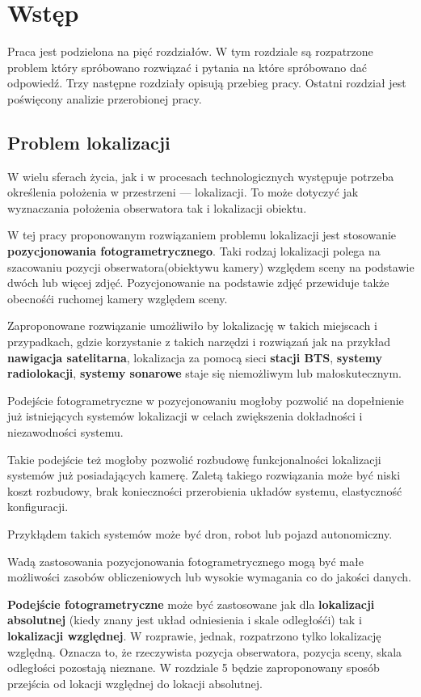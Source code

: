 
\chapter{Wstęp}
Praca jest podzielona na pięć rozdziałów. W tym rozdziale są rozpatrzone problem który spróbowano rozwiązać i pytania na które spróbowano dać odpowiedź. Trzy następne rozdziały opisują przebieg pracy. Ostatni rozdział jest poświęcony analizie przerobionej pracy.

\section{Problem lokalizacji}

W wielu sferach życia, jak i w procesach technologicznych występuje potrzeba określenia położenia w przestrzeni --- lokalizacji. To może dotyczyć jak wyznaczania położenia obserwatora tak i lokalizacji obiektu.

W tej pracy proponowanym rozwiązaniem problemu lokalizacji jest stosowanie \textbf{pozycjonowania fotogrametrycznego}. Taki rodzaj lokalizacji polega na szacowaniu pozycji obserwatora(obiektywu kamery) względem sceny na podstawie dwóch lub więcej zdjęć. Pozycjonowanie na podstawie zdjęć przewiduje także obecnośći ruchomej kamery względem sceny.

Zaproponowane rozwiązanie umożliwiło by lokalizację w takich miejscach i przypadkach, gdzie korzystanie z takich narzędzi i rozwiązań jak na przykład \textbf{nawigacja satelitarna}, lokalizacja za pomocą sieci \textbf{stacji BTS}, \textbf{systemy radiolokacji}, \textbf{systemy sonarowe} staje się niemożliwym lub małoskutecznym.

Podejście fotogrametryczne w pozycjonowaniu mogłoby pozwolić na dopełnienie już istniejących systemów lokalizacji w celach zwiększenia dokładności i niezawodności systemu.

Takie podejście też mogłoby pozwolić rozbudowę funkcjonalności lokalizacji systemów już posiadających kamerę. Zaletą takiego rozwiązania może być niski koszt rozbudowy, brak konieczności przerobienia układów systemu, elastyczność konfiguracji.

Przykłądem takich systemów może być dron, robot lub pojazd autonomiczny.

Wadą zastosowania pozycjonowania fotogrametrycznego mogą być małe możliwości zasobów obliczeniowych lub wysokie wymagania co do jakości danych.

\textbf{Podejście fotogrametryczne} może być zastosowane jak dla \textbf{lokalizacji absolutnej} (kiedy znany jest układ odniesienia i skale odległośći) tak i  \textbf{lokalizacji względnej}. W rozprawie, jednak, rozpatrzono tylko lokalizację względną. Oznacza to, że rzeczywista pozycja obserwatora, pozycja sceny, skala odległości pozostają nieznane. W rozdziale 5 będzie zaproponowany sposób przejścia od lokacji względnej do lokacji absolutnej.

